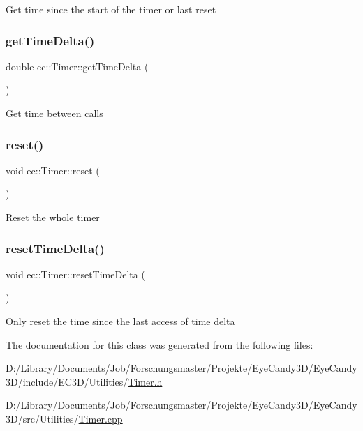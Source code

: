 Get time since the start of the timer or last reset \mbox{\label{classec_1_1_timer_a17b6b8d3cf83bb86df9164160b791016}} 
\subsubsection{\texorpdfstring{get\+Time\+Delta()}{getTimeDelta()}}
{\footnotesize\ttfamily double ec\+::\+Timer\+::get\+Time\+Delta (\begin{DoxyParamCaption}{ }\end{DoxyParamCaption})}

Get time between calls \mbox{\label{classec_1_1_timer_a0f712ea9fa17c4657a877b9322219aa3}} 
\subsubsection{\texorpdfstring{reset()}{reset()}}
{\footnotesize\ttfamily void ec\+::\+Timer\+::reset (\begin{DoxyParamCaption}{ }\end{DoxyParamCaption})}

Reset the whole timer \mbox{\label{classec_1_1_timer_a9c0d47620b70d0d7f392a9837601dad3}} 
\subsubsection{\texorpdfstring{reset\+Time\+Delta()}{resetTimeDelta()}}
{\footnotesize\ttfamily void ec\+::\+Timer\+::reset\+Time\+Delta (\begin{DoxyParamCaption}{ }\end{DoxyParamCaption})}

Only reset the time since the last access of time delta 

The documentation for this class was generated from the following files\+:\begin{DoxyCompactItemize}
\item 
D\+:/\+Library/\+Documents/\+Job/\+Forschungsmaster/\+Projekte/\+Eye\+Candy3\+D/\+Eye\+Candy3\+D/include/\+E\+C3\+D/\+Utilities/\mbox{\hyperlink{_timer_8h}{Timer.\+h}}\item 
D\+:/\+Library/\+Documents/\+Job/\+Forschungsmaster/\+Projekte/\+Eye\+Candy3\+D/\+Eye\+Candy3\+D/src/\+Utilities/\mbox{\hyperlink{_timer_8cpp}{Timer.\+cpp}}\end{DoxyCompactItemize}
